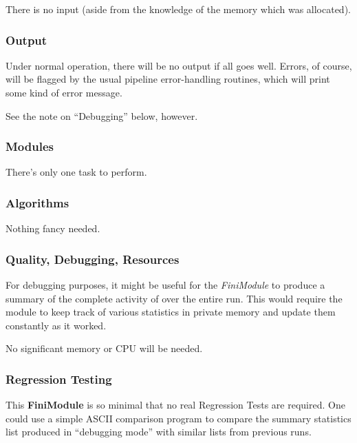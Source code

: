   There is no input (aside from the knowledge of the memory
which was allocated).

\subsubsection {Output}

  Under normal operation, there will be no output if all goes well.
Errors, of course, will be flagged by the usual pipeline
error-handling routines, which will print some kind of
error message.

  See the note on ``Debugging'' below, however.

\subsubsection {Modules}

  There's only one task to perform.

\subsubsection {Algorithms}

  Nothing fancy needed.

\subsubsection {Quality, Debugging, Resources}

  For debugging purposes, it might be useful for the {\it FiniModule}
to produce a summary of the complete activity of \fbs over the
entire run.  This would require the \fbs module to keep track
of various statistics in private memory and update them constantly
as it worked.

  No significant memory or CPU will be needed.

\subsubsection {Regression Testing}

  This {\bf FiniModule} is so minimal that no real Regression
Tests are required.  One could use a simple ASCII comparison
program to compare the summary statistics list produced
in ``debugging mode'' with similar lists from previous runs.


